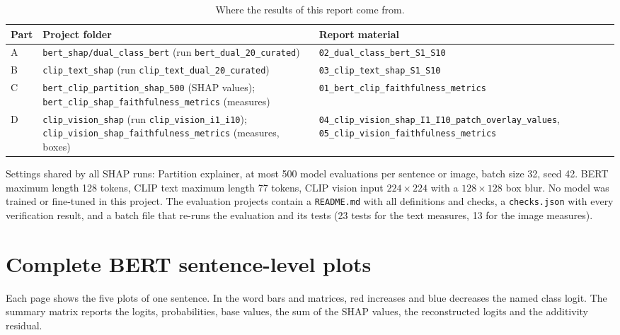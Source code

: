 \documentclass[11pt,a4paper]{article}
\begin{document}
\begin{table}[H]
  \centering
  \caption{Where the results of this report come from.}
  \label{tab:repro}
  \small
  \begin{tabularx}{\textwidth}{@{}l Y Y@{}}
    \toprule
    Part & Project folder & Report material \\
    \midrule
    A & \texttt{bert\_shap/dual\_class\_bert} (run \texttt{bert\_dual\_20\_curated}) &
        \texttt{02\_dual\_class\_bert\_S1\_S10} \\
    B & \texttt{clip\_text\_shap} (run \texttt{clip\_text\_dual\_20\_curated}) &
        \texttt{03\_clip\_text\_shap\_S1\_S10} \\
    C & \texttt{bert\_clip\_partition\_shap\_500} (SHAP values);
        \texttt{bert\_clip\_shap\_faithfulness\_metrics} (measures) &
        \texttt{01\_bert\_clip\_faithfulness\_metrics} \\
    D & \texttt{clip\_vision\_shap} (run \texttt{clip\_vision\_i1\_i10});
        \texttt{clip\_vision\_shap\_faithfulness\_metrics} (measures, boxes) &
        \texttt{04\_clip\_vision\_shap\_I1\_I10\_\allowbreak patch\_overlay\_values},
        \texttt{05\_clip\_vision\_\allowbreak faithfulness\_metrics} \\
    \bottomrule
  \end{tabularx}
\end{table}

Settings shared by all SHAP runs: Partition explainer, at most 500 model evaluations per
sentence or image, batch size 32, seed 42. BERT maximum length 128 tokens, CLIP text
maximum length 77 tokens, CLIP vision input $224\times224$ with a $128\times128$ box blur.
No model was trained or fine-tuned in this project. The evaluation projects contain a
\texttt{README.md} with all definitions and checks, a \texttt{checks.json} with every
verification result, and a batch file that re-runs the evaluation and its tests (23 tests
for the text measures, 13 for the image measures).

\clearpage
\section{Complete BERT sentence-level plots}\label{app:bert-plots}

Each page shows the five plots of one sentence. In the word bars and matrices, red
increases and blue decreases the named class logit. The summary matrix reports the logits,
probabilities, base values, the sum of the SHAP values, the reconstructed logits and the
additivity residual.
\end{document}
